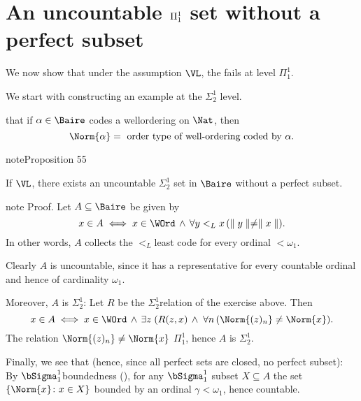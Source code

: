 \documentclass[letterpaper,10pt,english]{jupyterBook}
\begin{document}
\section{An uncountable \protect\(\Pi^1_1\protect\) set without a perfect subset}
\label{\detokenize{constructible-reals:an-uncountable-pi-1-1-set-without-a-perfect-subset}}
\sphinxAtStartPar
We now show that under the assumption \(\VL\), the  fails at level \(\Pi^1_1\).

\sphinxAtStartPar
We start with constructing an example at the \(\Sigma^1_2\) level.

\sphinxAtStartPar
{\hyperref[\detokenize{coanalytic:sec-well-founded}]{}} that if \(\alpha \in \Baire\) codes a well\sphinxhyphen{}ordering on \(\Nat\), then
\begin{equation*}
	\Norm{\alpha} = \text{ order type of well-ordering coded by $\alpha$}.
\end{equation*}\label{constructible-reals:prop-sigma12-perfect}
\begin{sphinxadmonition}{note}{Proposition 55}



\sphinxAtStartPar
If \(\VL\), there exists an uncountable \(\Sigma^1_2\) set in \(\Baire\) without a perfect subset.
\end{sphinxadmonition}

\begin{sphinxadmonition}{note}
\sphinxAtStartPar
Proof. Let \(A \subseteq \Baire\) be given by
\begin{equation*}
    x \in A \iff x \in \WOrd \, \wedge \, \forall y <_L x \,  ( \parallel y \parallel \ne \parallel x \parallel).
\end{equation*}
\sphinxAtStartPar
In other words, \(A\) collects the \(<_L\)\sphinxhyphen{}least code for every ordinal \(< \omega_1\).

\sphinxAtStartPar
Clearly \(A\) is uncountable, since it has a representative for every countable ordinal and hence of cardinality \(\omega_1\).

\sphinxAtStartPar
Moreover, \(A\) is \(\Sigma^1_2\): Let \(R\) be the \(\Sigma^1_2\)\sphinxhyphen{}relation of the exercise above. Then
\begin{equation*}
x \in A \iff x \in \WOrd \, \wedge \, \exists z \;(R(z,x) \, \wedge \; \forall n \,  ( \Norm {(z)_n} \neq \Norm{x}).
\end{equation*}
\sphinxAtStartPar
The relation \(\Norm{(z)_n} \neq  \Norm{x}\) \(\Pi^1_1\), hence \(A\) is \(\Sigma^1_2\).

\sphinxAtStartPar
Finally, we see that  (hence, since all perfect sets are closed, no perfect subset): By \(\bSigma^1_1\)\sphinxhyphen{}boundedness ({\hyperref[\detokenize{coanalytic:thm-sigma11-bounding}]{}}), for any \(\bSigma^1_1\) subset \(X \subseteq A\) the set \(\{ \Norm{x} \colon x \in X\}\) bounded by an ordinal \(\gamma < \omega_1\), hence countable.
\end{sphinxadmonition}
\end{document}
